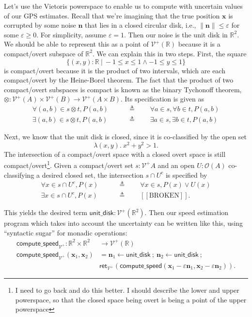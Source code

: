 \documentclass{article}           %
\newcommand{\R}{\mathbb{R}}
\newcommand{\fun}[2]{\lambda {#1}.\  {#2}}
\newcommand{\suchthat}{\ |\ }
\newcommand{\Open}[1]{\mathcal{O}({#1})}
\newcommand{\Viet}{{\mathcal{V}^+}}
\newcommand{\ret}[1]{\mathsf{ret}_{#1}}
\newcommand{\ve}[1]{\mathbf{#1}}
\newcommand{\then}{\ ;\ }
\newcommand{\defeq}{\triangleq}
\begin{document}
Let's use the Vietoris powerspace to enable us to compute with uncertain values of our GPS estimates. Recall that we're imagining that the true position $\ve{x}$ is corrupted by some noise $\ve{n}$ that lies in a closed circular disk, i.e., $\| \ve{n} \| \le \varepsilon$ for some $\varepsilon \ge 0$. For simplicity, assume $\varepsilon = 1$. Then our noise is the unit disk in $\R^2$. We should be able to represent this as a point of $\Viet(\R)$ because it is a compact/overt subspace of $\R^2$. We can explain this in two steps. First, the square 
\[
\{ (x, y) : \R \suchthat -1 \le x \le 1 \wedge -1 \le y \le 1 \}
\]
is compact/overt because it is the product of two intervals, which are each compact/overt by the Heine-Borel theorem. The fact that the product of two compact/overt subspaces is compact is known as the binary Tychonoff theorem, $\otimes : \Viet(A) \times \Viet(B) \to \Viet(A \times B)$. Its specification is given as
\begin{align*}
\forall (a, b) \in s \otimes t, P(a, b)
\qquad &\defeq \qquad
\forall a \in s, \forall b \in t, P(a, b)
\\
\exists (a, b) \in s \otimes t, P(a, b)
\qquad &\defeq \qquad
\exists a \in s, \exists b \in t, P(a, b)
\end{align*}

Next, we know that the unit disk is closed, since it is co-classified by the open set
\[
\fun{(x,y)}{x^2 + y^2 > 1}.
\]
The intersection of a compact/overt space with a closed overt space is still compact/overt\footnote{I need to go back and do this better. I should describe the lower and upper powerspace, so that the closed space being overt is being a point of the upper powerspace}. Given a compact/overt set $s : \Viet{A}$ and an open $U : \Open{A}$ co-classifying a desired closed set, the intersection $s \cap U^c$ is specified by
\begin{align*}
\forall x \in s \cap U^c, P(x) \qquad &\defeq \qquad 
  \forall x \in s, P(x) \vee U(x)
\\
\exists x \in s \cap U^c, P(x) \qquad &\defeq \qquad 
  [[\text{BROKEN}]].
\end{align*}

This yields the desired term $\mathsf{unit\_disk} : \Viet(\R^2)$. Then our speed estimation program which takes into account the uncertainty can be written like this, using ``syntactic sugar'' for monadic operations:
\begin{align*}
\mathsf{compute\_speed}_\Viet : \R^2 \times \R^2 &\to \Viet(\R)
\\ \mathsf{compute\_speed}_\Viet (\ve{x}_1, \ve{x}_2) &= 
  \ve{n}_1 \leftarrow \mathsf{unit\_disk} 
  \then
  \ve{n}_2 \leftarrow \mathsf{unit\_disk}
  \then
  \\ &\ret{\Viet} \left( \mathsf{compute\_speed}(\ve{x}_1 - \varepsilon \ve{n}_1, \ve{x}_2 - \varepsilon \ve{n}_2) \right).
\end{align*}
\end{document}
